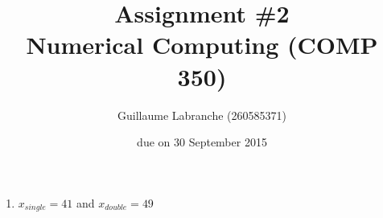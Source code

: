 \documentclass{article}
\author{Guillaume Labranche (260585371)}
\title{Assignment \#2\\Numerical Computing (COMP 350)}
\date{due on 30 September 2015}
\begin{document}
\maketitle
 
\begin{enumerate}%

\item $x_{single} = 41$ and $x_{double} = 49$

\end{enumerate}
\end{document}
